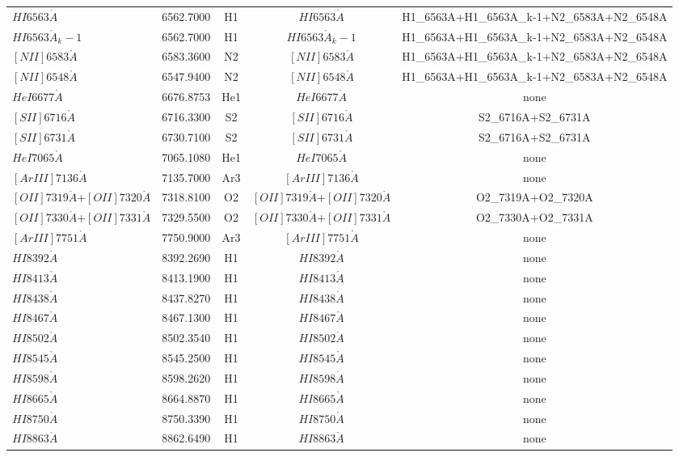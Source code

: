 \documentclass{article}%
\begin{document}
\begin{preview}
\begin{tabular}{lcccc}
$HI6563\mathring{A}$&6562.7000&H1&$HI6563\mathring{A}$&H1\_6563A+H1\_6563A\_k{-}1+N2\_6583A+N2\_6548A\\%
$HI6563\mathring{A}_k-1$&6562.7000&H1&$HI6563\mathring{A}_k-1$&H1\_6563A+H1\_6563A\_k{-}1+N2\_6583A+N2\_6548A\\%
$[NII]6583\mathring{A}$&6583.3600&N2&$[NII]6583\mathring{A}$&H1\_6563A+H1\_6563A\_k{-}1+N2\_6583A+N2\_6548A\\%
$[NII]6548\mathring{A}$&6547.9400&N2&$[NII]6548\mathring{A}$&H1\_6563A+H1\_6563A\_k{-}1+N2\_6583A+N2\_6548A\\%
$HeI6677\mathring{A}$&6676.8753&He1&$HeI6677\mathring{A}$&none\\%
$[SII]6716\mathring{A}$&6716.3300&S2&$[SII]6716\mathring{A}$&S2\_6716A+S2\_6731A\\%
$[SII]6731\mathring{A}$&6730.7100&S2&$[SII]6731\mathring{A}$&S2\_6716A+S2\_6731A\\%
$HeI7065\mathring{A}$&7065.1080&He1&$HeI7065\mathring{A}$&none\\%
$[ArIII]7136\mathring{A}$&7135.7000&Ar3&$[ArIII]7136\mathring{A}$&none\\%
$[OII]7319\mathring{A}$+$[OII]7320\mathring{A}$&7318.8100&O2&$[OII]7319\mathring{A}$+$[OII]7320\mathring{A}$&O2\_7319A+O2\_7320A\\%
$[OII]7330\mathring{A}$+$[OII]7331\mathring{A}$&7329.5500&O2&$[OII]7330\mathring{A}$+$[OII]7331\mathring{A}$&O2\_7330A+O2\_7331A\\%
$[ArIII]7751\mathring{A}$&7750.9000&Ar3&$[ArIII]7751\mathring{A}$&none\\%
$HI8392\mathring{A}$&8392.2690&H1&$HI8392\mathring{A}$&none\\%
$HI8413\mathring{A}$&8413.1900&H1&$HI8413\mathring{A}$&none\\%
$HI8438\mathring{A}$&8437.8270&H1&$HI8438\mathring{A}$&none\\%
$HI8467\mathring{A}$&8467.1300&H1&$HI8467\mathring{A}$&none\\%
$HI8502\mathring{A}$&8502.3540&H1&$HI8502\mathring{A}$&none\\%
$HI8545\mathring{A}$&8545.2500&H1&$HI8545\mathring{A}$&none\\%
$HI8598\mathring{A}$&8598.2620&H1&$HI8598\mathring{A}$&none\\%
$HI8665\mathring{A}$&8664.8870&H1&$HI8665\mathring{A}$&none\\%
$HI8750\mathring{A}$&8750.3390&H1&$HI8750\mathring{A}$&none\\%
$HI8863\mathring{A}$&8862.6490&H1&$HI8863\mathring{A}$&none\\%

\end{tabular}
\end{preview}
\end{document}
